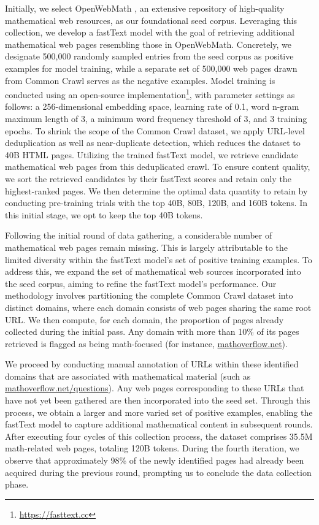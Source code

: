 Initially, we select OpenWebMath \citep{openwebmath}, an extensive repository of high-quality mathematical web resources, as our foundational seed corpus. Leveraging this collection, we develop a fastText model \citep{joulin2016fasttext} with the goal of retrieving additional mathematical web pages resembling those in OpenWebMath. Concretely, we designate 500,000 randomly sampled entries from the seed corpus as positive examples for model training, while a separate set of 500,000 web pages drawn from Common Crawl serves as the negative examples. Model training is conducted using an open-source implementation\footnote{\url{https://fasttext.cc}}, with parameter settings as follows: a 256-dimensional embedding space, learning rate of 0.1, word n-gram maximum length of 3, a minimum word frequency threshold of 3, and 3 training epochs. To shrink the scope of the Common Crawl dataset, we apply URL-level deduplication as well as near-duplicate detection, which reduces the dataset to 40B HTML pages. Utilizing the trained fastText model, we retrieve candidate mathematical web pages from this deduplicated crawl. To ensure content quality, we sort the retrieved candidates by their fastText scores and retain only the highest-ranked pages. We then determine the optimal data quantity to retain by conducting pre-training trials with the top 40B, 80B, 120B, and 160B tokens. In this initial stage, we opt to keep the top 40B tokens.

Following the initial round of data gathering, a considerable number of mathematical web pages remain missing. This is largely attributable to the limited diversity within the fastText model’s set of positive training examples. To address this, we expand the set of mathematical web sources incorporated into the seed corpus, aiming to refine the fastText model’s performance. Our methodology involves partitioning the complete Common Crawl dataset into distinct domains, where each domain consists of web pages sharing the same root URL. We then compute, for each domain, the proportion of pages already collected during the initial pass. Any domain with more than 10\% of its pages retrieved is flagged as being math-focused (for instance, \url{mathoverflow.net}). 

We proceed by conducting manual annotation of URLs within these identified domains that are associated with mathematical material (such as \url{mathoverflow.net/questions}). Any web pages corresponding to these URLs that have not yet been gathered are then incorporated into the seed set. Through this process, we obtain a larger and more varied set of positive examples, enabling the fastText model to capture additional mathematical content in subsequent rounds. After executing four cycles of this collection process, the dataset comprises 35.5M math-related web pages, totaling 120B tokens. During the fourth iteration, we observe that approximately 98\% of the newly identified pages had already been acquired during the previous round, prompting us to conclude the data collection phase.

